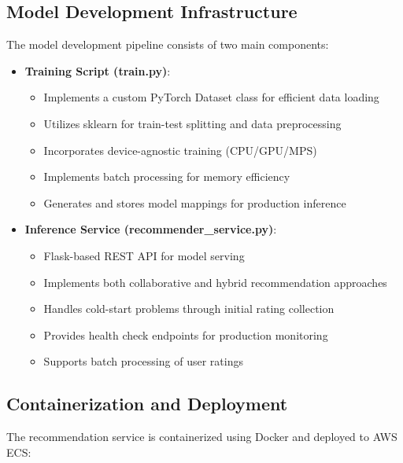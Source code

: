 \documentclass[12pt]{article}
\begin{document}
\subsection{Model Development Infrastructure}
The model development pipeline consists of two main components:

\begin{itemize}
    \item \textbf{Training Script (train.py)}:
    \begin{itemize}
        \item Implements a custom PyTorch Dataset class for efficient data loading
        \item Utilizes sklearn for train-test splitting and data preprocessing
        \item Incorporates device-agnostic training (CPU/GPU/MPS)
        \item Implements batch processing for memory efficiency
        \item Generates and stores model mappings for production inference
    \end{itemize}

    \item \textbf{Inference Service (recommender\_service.py)}:
    \begin{itemize}
        \item Flask-based REST API for model serving
        \item Implements both collaborative and hybrid recommendation approaches
        \item Handles cold-start problems through initial rating collection
        \item Provides health check endpoints for production monitoring
        \item Supports batch processing of user ratings
    \end{itemize}
\end{itemize}

\subsection{Containerization and Deployment}
The recommendation service is containerized using Docker and deployed to AWS ECS:
\end{document}
